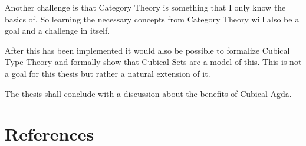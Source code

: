 \documentclass{article}
\begin{document}
Another challenge is that Category Theory is something that I only know the
basics of. So learning the necessary concepts from Category Theory will also be
a goal and a challenge in itself.

After this has been implemented it would also be possible to formalize Cubical
Type Theory and formally show that Cubical Sets are a model of this. This is not
a goal for this thesis but rather a natural extension of it.

The thesis shall conclude with a discussion about the benefits of Cubical Agda.
%
\section{References}
%

\nocite{cubical-demo}
\nocite{coquand-2013}

\end{document}
